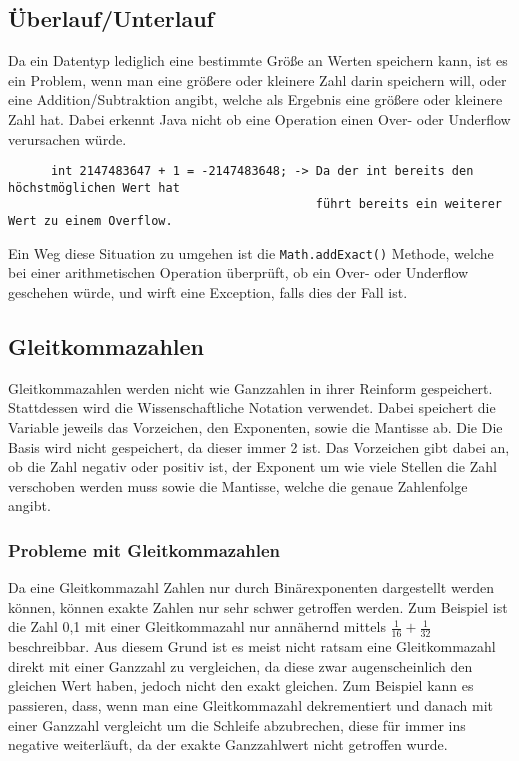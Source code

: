 \documentclass{article}
\begin{document}
	  \subsection{Überlauf/Unterlauf}
	  Da ein Datentyp lediglich eine bestimmte Größe an Werten speichern kann, ist es ein Problem, wenn man eine größere oder kleinere Zahl darin speichern will, oder eine Addition/Subtraktion angibt, welche als Ergebnis eine größere oder kleinere Zahl hat. Dabei erkennt Java nicht ob eine Operation einen Over- oder Underflow verursachen würde.
	  \begin{verbatim}
	  int 2147483647 + 1 = -2147483648; -> Da der int bereits den höchstmöglichen Wert hat
	                                       führt bereits ein weiterer Wert zu einem Overflow.
	  \end{verbatim}
	  Ein Weg diese Situation zu umgehen ist die \verb|Math.addExact()| Methode, welche bei einer arithmetischen Operation überprüft, ob ein Over- oder Underflow geschehen würde, und wirft eine Exception, falls dies der Fall ist.
	  \subsection{Gleitkommazahlen}
	  Gleitkommazahlen werden nicht wie Ganzzahlen in ihrer Reinform gespeichert. Stattdessen wird die Wissenschaftliche Notation verwendet. Dabei speichert die Variable jeweils das Vorzeichen, den Exponenten, sowie die Mantisse ab. Die Die Basis wird nicht gespeichert, da dieser immer 2 ist. Das Vorzeichen gibt dabei an, ob die Zahl negativ oder positiv ist, der Exponent um wie viele Stellen die Zahl verschoben werden muss sowie die Mantisse, welche die genaue Zahlenfolge angibt. 
	  \subsubsection{Probleme mit Gleitkommazahlen}
	  Da eine Gleitkommazahl Zahlen nur durch Binärexponenten dargestellt werden können, können exakte Zahlen nur sehr schwer getroffen werden. Zum Beispiel ist die Zahl 0,1 mit einer Gleitkommazahl nur annähernd mittels $\frac{1}{16} + \frac{1}{32}$ beschreibbar. Aus diesem Grund ist es meist nicht ratsam eine Gleitkommazahl direkt mit einer Ganzzahl zu vergleichen, da diese zwar augenscheinlich den gleichen Wert haben, jedoch nicht den exakt gleichen. Zum Beispiel kann es passieren, dass, wenn man eine Gleitkommazahl dekrementiert und danach mit einer Ganzzahl vergleicht um die Schleife abzubrechen, diese für immer ins negative weiterläuft, da der exakte Ganzzahlwert nicht getroffen wurde.
\end{document}
